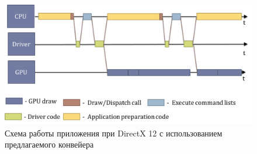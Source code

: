 \begin{figure}[ht!] 
	\center
	\includegraphics [scale=0.23] {my_folder/images//pipeline_dx12_me}
	\caption{Схема работы приложения при DirectX 12 с использованием предлагаемого конвейера} 
	\label{fig:pipeline_dx12_me}  
\end{figure}


